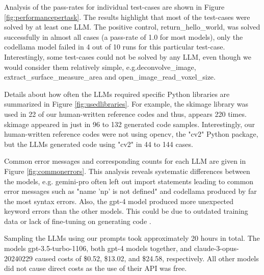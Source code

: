 \documentclass{ecai}
\begin{document}
Analysis of the pass-rates for individual test-cases are shown in Figure \ref{fig:performancepertask}. The results highlight that most of the test-cases were solved by at least one LLM. The positive control, return\_hello\_world, was solved successfully in almost all cases (a pass-rate of 1.0 for most models), only the codellama model failed in 4 out of 10 runs for this particular test-case. Interestingly, some test-cases could not be solved by any LLM, even though we would consider them relatively simple, e.g.deconvolve\_image, extract\_surface\_measure\_area and open\_image\_read\_voxel\_size.

Details about how often the LLMs required specific Python libraries are summarized in Figure \ref{fig:usedlibraries}. For example, the skimage library was used in 22 of our human-written reference codes and thus, appears 220 times. skimage appeared in just in 96 to 132 generated code samples. Interestingly, our human-written reference codes were not using opencv, the "cv2" Python package, but the LLMs generated code using "cv2" in 44 to 144 cases.

Common error messages and corresponding counts for each LLM are given in Figure \ref{fig:commonerrors}. This analysis reveals systematic differences between the models, e.g. gemini-pro often left out import statements leading to common error messages such as "name 'np' is not defined" and codellama produced by far the most syntax errors. Also, the gpt-4 model produced more unexpected keyword errors than the other models. This could be due to outdated training data or lack of fine-tuning on generating code .

Sampling the LLMs using our prompts took approximately 20 hours in total. The models gpt-3.5-turbo-1106, both gpt-4 models together, and claude-3-opus-20240229 caused costs of \$0.52, \$13.02, and \$24.58, respectively. All other models did not cause direct costs as the use of their API was free. 
\end{document}

